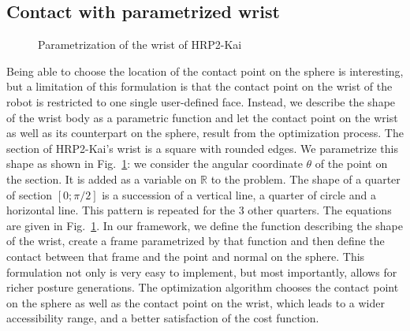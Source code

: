 \subsection{Contact with parametrized wrist}

\begin{figure}[!htb]
\centering
  \centering
  \setlength\fboxsep{0pt}
  \setlength\fboxrule{1pt}
\caption{Parametrization of the wrist of HRP2-Kai}
\label{fig:param_wrist_detail}
\end{figure}

Being able to choose the location of the contact point on the sphere is interesting, but a limitation of this formulation is that the contact point on the wrist of the robot is restricted to one single user-defined face.
Instead, we describe the shape of the wrist body as a parametric function and let the contact point on the wrist as well as its counterpart on the sphere, result from the optimization process.
The section of HRP2-Kai's wrist is a square with rounded edges.
We parametrize this shape as shown in Fig.~\ref{fig:param_wrist_detail}:
we consider the angular coordinate $\theta$ of the point on the section.
It is added as a variable on $\mathbb{R}$ to the problem.
The shape of a quarter of section $[0;\pi/2]$ is a succession of a vertical line, a quarter of circle and a horizontal line.
This pattern is repeated for the 3 other quarters.
The equations are given in Fig.~\ref{fig:param_wrist_detail}.
In our framework, we define the function describing the shape of the wrist, create a frame parametrized by that function and then define the contact between that frame and the point and normal on the sphere.
This formulation not only is very easy to implement, but most importantly, allows for richer posture generations.
The optimization algorithm chooses the contact point on the sphere as well as the contact point on the wrist, which leads to a wider accessibility range, and a better satisfaction of the cost function.

